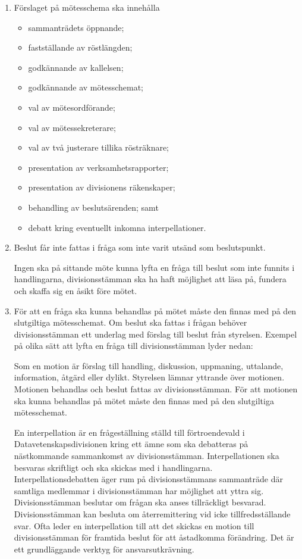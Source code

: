 \documentclass{dvd}
\begin{document}
\begin{enumerate}[label=\arabic* §, ref=\arabic*]
		\item Förslaget på mötesschema ska innehålla

		\begin{itemize}
			\item sammanträdets öppnande;
			\item fastställande av röstlängden;
			\item godkännande av kallelsen;
			\item godkännande av mötesschemat;
			\item val av mötesordförande;
			\item val av mötessekreterare;
			\item val av två justerare tillika rösträknare;
			\item presentation av verksamhetsrapporter;
			\item presentation av divisionens räkenskaper;
			\item behandling av beslutsärenden; samt
			\item debatt kring eventuellt inkomna interpellationer.
		\end{itemize}

		\item Beslut får inte fattas i fråga som inte varit utsänd som beslutspunkt.

		Ingen ska på sittande möte kunna lyfta en fråga till beslut som inte funnits i handlingarna, divisionsstämman ska ha haft möjlighet att läsa på, fundera och skaffa sig en åsikt före mötet.

		\item För att en fråga ska kunna behandlas på mötet måste den finnas med på den slutgiltiga mötesschemat.
		Om beslut ska fattas i frågan behöver divisionsstämman ett underlag med förslag till beslut från styrelsen.
		Exempel på olika sätt att lyfta en fråga till divisionsstämman lyder nedan:

		Som en motion är förslag till handling, diskussion, uppmaning, uttalande, information, åtgärd eller dylikt.
		Styrelsen lämnar yttrande över motionen.
		Motionen behandlas och beslut fattas av divisionsstämman.
		För att motionen ska kunna behandlas på mötet måste den finnas med på den slutgiltiga mötesschemat.

		En interpellation är en frågeställning ställd till förtroendevald i Datavetenskapsdivisionen kring ett ämne som ska debatteras på nästkommande sammankomst av divisionsstämman.
		Interpellationen ska besvaras skriftligt och ska skickas med i handlingarna.
		Interpellationsdebatten äger rum på divisionsstämmans sammanträde där samtliga medlemmar i divisionsstämman har möjlighet att yttra sig.
		Divisionsstämman beslutar om frågan ska anses tillräckligt besvarad.
		Divisionsstämman kan besluta om återremittering vid icke tillfredsställande svar.
		Ofta leder en interpellation till att det skickas en motion till divisionsstämman för framtida beslut för att åstadkomma förändring.
		Det är ett grundläggande verktyg för ansvarsutkrävning.


\end{enumerate}
\end{document}
